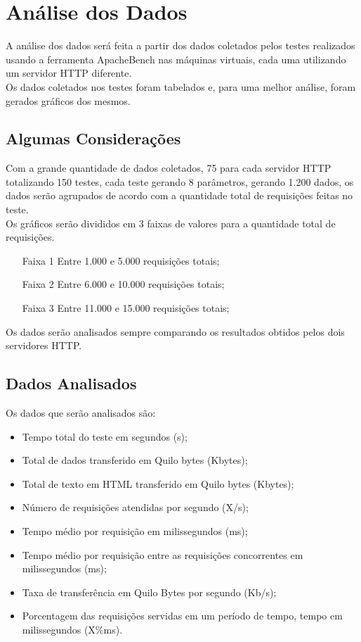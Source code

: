 \chapter{Análise dos Dados}\label{cap:analise-dos-dados}

A análise dos dados será feita a partir dos dados coletados pelos testes realizados usando a ferramenta ApacheBench nas máquinas virtuais, cada uma utilizando um servidor HTTP diferente.\\
Os dados coletados nos testes foram tabelados e, para uma melhor análise, foram gerados gráficos dos mesmos.

\section{Algumas Considerações}
Com a grande quantidade de dados coletados, 75 para cada servidor HTTP totalizando 150 testes, cada teste gerando 8 parâmetros, gerando 1.200 dados, os dados serão agrupados de acordo com a quantidade total de requisições feitas no teste. \\
Os gráficos serão divididos em 3 faixas de valores para a quantidade total de requisições.
\begin{itemize}
	\item[Faixa 1] Entre 1.000 e 5.000 requisições totais;
	\item[Faixa 2] Entre 6.000 e 10.000 requisições totais;
	\item[Faixa 3] Entre 11.000 e 15.000 requisições totais;
\end{itemize}
Os dados serão analisados sempre comparando os resultados obtidos pelos dois servidores HTTP.\\

\section{Dados Analisados}
Os dados que serão analisados são:

\begin{itemize}
	\item Tempo total do teste em segundos (s);
	\item Total de dados transferido em Quilo bytes (Kbytes);
	\item Total de texto em HTML transferido em Quilo bytes (Kbytes);
	\item Número de requisições atendidas por segundo (X/s);
	\item Tempo médio por requisição em milissegundos (ms);
	\item Tempo médio por requisição entre as requisições concorrentes em milissegundos (ms);
	\item Taxa de transferência em Quilo Bytes por segundo (Kb/s);
	\item Porcentagem das requisições servidas em um período de tempo, tempo em milissegundos (X\%ms).
\end{itemize}

